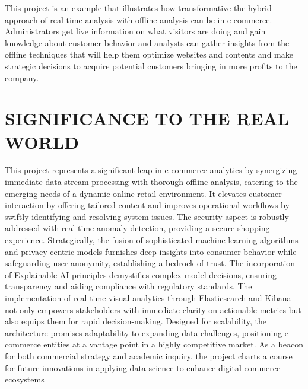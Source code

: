\documentclass[conference]{IEEEtran}
\begin{document}
This project is an example that illustrates how transformative the hybrid approach of real-time analysis with offline analysis can be in e-commerce. Administrators get live information on what visitors are doing and gain knowledge about customer behavior and analysts can gather insights from the offline techniques that will help them optimize websites and contents and make strategic decisions to acquire potential customers bringing in more profits to the company.

\section{SIGNIFICANCE TO THE REAL WORLD}

This project represents a significant leap in e-commerce analytics by synergizing immediate data stream processing with thorough offline analysis, catering to the emerging needs of a dynamic online retail environment. It elevates customer interaction by offering tailored content and improves operational workflows by swiftly identifying and resolving system issues. The security aspect is robustly addressed with real-time anomaly detection, providing a secure shopping experience. Strategically, the fusion of sophisticated machine learning algorithms and privacy-centric models furnishes deep insights into consumer behavior while safeguarding user anonymity, establishing a bedrock of trust. The incorporation of Explainable AI principles demystifies complex model decisions, ensuring transparency and aiding compliance with regulatory standards. The implementation of real-time visual analytics through Elasticsearch and Kibana not only empowers stakeholders with immediate clarity on actionable metrics but also equips them for rapid decision-making. Designed for scalability, the architecture promises adaptability to expanding data challenges, positioning e-commerce entities at a vantage point in a highly competitive market. As a beacon for both commercial strategy and academic inquiry, the project charts a course for future innovations in applying data science to enhance digital commerce ecosystems
\end{document}
